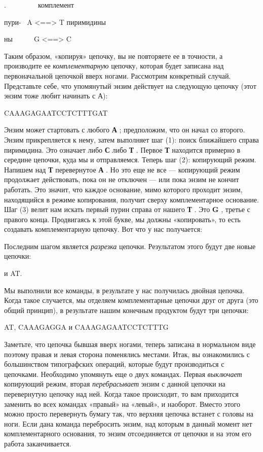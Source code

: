 .~~~~~~~~~комплемент

пури- \textbar{} ~A \textless==\textgreater{} T \textbar пиримидины

ны~~~~~\textbar~G \textless==\textgreater{} C \textbar{}

Таким образом, «копируя» цепочку, вы не повторяете ее в точности, а производите ее \emph{комплементарную} цепочку, которая будет записана над первоначальной цепочкой вверх ногами. Рассмотрим конкретный случай. Представьте себе, что упомянутый энзим действует на следующую цепочку (этот энзим тоже любит начинать с А):

CAAAGAGAATCCTCTTTGAT

Энзим может стартовать с любого \textbf{А} ; предположим, что он начал со второго. Энзим прикрепляется к нему, затем выполняет шаг (1): поиск ближайшего справа пиримидина. Это означает либо \textbf{С} либо \textbf{Т} . Первое \textbf{Т} находится примерно в середине цепочки, куда мы и отправляемся. Теперь шаг (2): копирующий режим. Напишем над \textbf{Т} перевернутое \textbf{А} . Но это еще не все --- копирующий режим продолжает действовать, пока он не отключен --- или пока энзим не кончит работать. Это значит, что каждое основание, мимо которого проходит энзим, находящийся в режиме копирования, получит сверху комплементарное основание. Шаг (3) велит нам искать первый пурин справа от нашего \textbf{Т} . Это \textbf{G} , третье с правого конца. Продвигаясь к этой букве, мы должны «копировать», то есть создавать комплементарную цепочку. Вот что у нас получается:

Последним шагом является \emph{разрезка} цепочки. Результатом этого будут две новые цепочки:

и AT.

Мы выполнили все команды, в результате у нас получилась двойная цепочка. Когда такое случается, мы отделяем комплементарные цепочки друг от друга (это общий принцип), в результате нашим конечным продуктом будут три цепочки:

AT, CAAAGAGGA и CAAAGAGAATCCTCTTTG

Заметьте, что цепочка бывшая вверх ногами, теперь записана в нормальном виде поэтому правая и левая сторона поменялись местами. Итак, вы ознакомились с большинством типографских операций, которые будут производиться с цепочками. Необходимо упомянуть еще о двух командах. Первая \emph{выключает} копирующий режим, вторая \emph{перебрасывает} энзим с данной цепочки на перевернутую цепочку над ней. Когда такое происходит, то вам приходится заменить во всех командах «правый» на «левый», и наоборот. Вместо этого можно просто перевернуть бумагу так, что верхняя цепочка встанет с головы на ноги. Если дана команда перебросить энзим, над которым в данный момент нет комплементарного основания, то энзим отсоединяется от цепочки и на этом его работа заканчивается.

